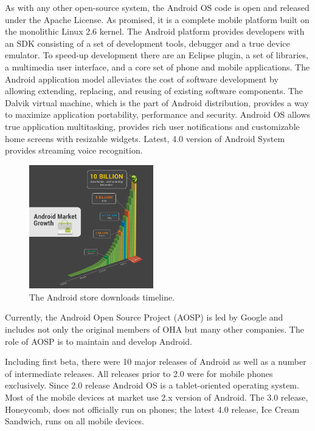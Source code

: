 \documentclass[a4paper,10pt]{article}
\numberwithin{equation}{subsection}
\begin{document}
As with any other open-source system, the Android OS code is open and released under the Apache License.
As promised, it is a complete mobile platform built on the monolithic Linux 2.6 kernel. 
The Android platform provides developers with an SDK consisting of a set of development tools, 
debugger and a true device emulator. To speed-up development there are an Eclipse plugin, 
a set of libraries, a multimedia user interface, and a core set of phone and mobile applications. 
The Android application model alleviates the cost of software development by 
allowing extending, replacing, and reusing of existing software components. 
The Dalvik virtual machine, which is the part of Android distribution, provides a way to 
maximize application portability, performance and security. 
Android OS allows true application multitasking, provides rich user 
notifications and customizable home screens with resizable widgets. 
Latest, 4.0 version of Android System provides streaming voice recognition.
\begin{figure}
    \begin{center}
   \includegraphics[scale=0.3,width=0.48\textwidth]{figures/graph_only_3.png}
   \end{center}
   \caption{The Android store downloads timeline.}
   \label{fig:android_downloads}
\end{figure}

Currently, the Android Open Source Project (AOSP) is led by Google and includes not only the 
original members of OHA but many other companies. The role of AOSP is to maintain and develop 
Android.

Including first beta, there were 10 major releases of Android as well as a number of intermediate 
releases. All releases prior to 2.0 were for mobile phones exclusively. Since 2.0 release 
Android OS is a tablet-oriented operating system. Most of the mobile devices at market use 
2.x version of Android. The 3.0 release, Honeycomb, does not officially run on phones; 
the latest 4.0 release, Ice Cream Sandwich, runs on all mobile devices.
\end{document}
